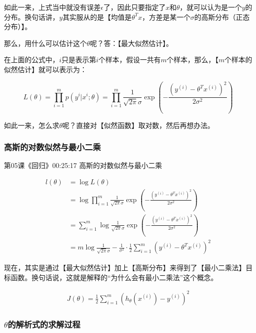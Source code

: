 \documentclass[UTF8]{ctexbook}
\begin{document}
如此一来，上式当中就没有误差$\epsilon$了，因此只要指定了$x$和$\theta$，就可以认为是一个$y$的分布。换句话讲，$y$其实服从的是【均值是$\theta^{T}x$，方差是某一个$\sigma$的高斯分布（正态分布）】。

那么，用什么可以估计这个$\theta$呢？答：【最大似然估计】。

在上面的公式中，$i$只是表示第$i$个样本，假设一共有$m$个样本，那么，【$m$个样本的似然估计】就可以表示为：

\begin{displaymath}
L(\theta)=\prod_{i=1}^{m}p(y^{i}|x^{i};\theta) = \prod_{i=1}^{m}\frac{1}{\sqrt{2\pi}\sigma}\exp(-\frac{(y^{(i)} - \theta^{T}x^{(i)})^{2}}{2\sigma^{2}})
\end{displaymath}

如此一来，怎么求$\theta$呢？直接对【似然函数】取对数，然后再想办法。

\subsubsection{高斯的对数似然与最小二乘}

第05课《回归》00:25:17 高斯的对数似然与最小二乘

\begin{equation}
\begin{aligned}
l(\theta)&=\log L(\theta)\\
&=\log \prod_{i=1}^{m}\frac{1}{\sqrt{2\pi}\sigma}\exp(-\frac{(y^{(i)} - \theta^{T}x^{(i)})^{2}}{2\sigma^{2}})\\
&=\sum_{i=1}^{m} \log \frac{1}{\sqrt{2\pi}\sigma}\exp(-\frac{(y^{(i)} - \theta^{T}x^{(i)})^{2}}{2\sigma^{2}})\\
&=m\log \frac{1}{\sqrt{2\pi}\sigma} - \frac{1}{\sigma^{2}} \cdot \frac{1}{2} \sum_{i=1}^{m}(y^{(i)} - \theta^{T}x^{(i)})^{2}
\end{aligned}
\end{equation}

现在，其实是通过【最大似然估计】加上【高斯分布】来得到了【最小二乘法】目标函数。换句话说，这就是解释的“为什么会有最小二乘法”这个概念。

\begin{equation}
\begin{aligned}
J(\theta)=\frac{1}{2} \sum_{i=1}^{m}(h_{\theta}(x^{(i)}) - y^{(i)})^{2}
\end{aligned}
\end{equation}

\subsubsection{$\theta$的解析式的求解过程}
\end{document}

